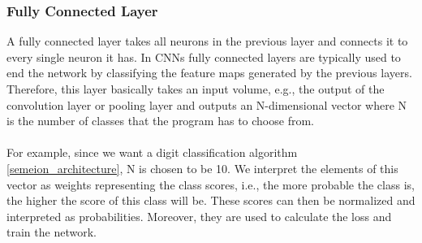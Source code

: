 \documentclass[a4paper, 11pt, twoside, openright]{article}
\begin{document}
\subsubsection{Fully Connected Layer} \label{subsub:fclayer}
A fully connected layer takes all neurons in the previous layer and connects it to every single neuron it has. In CNNs fully connected layers are typically used to end the network by classifying the feature maps generated by the previous layers. Therefore, this layer basically takes an input volume, e.g., the output of the convolution layer or pooling layer and outputs an N-dimensional vector where N is the number of classes that the program has to choose from.\\ \\
For example, since we want a digit classification algorithm \ref{semeion_architecture}, N is chosen to be 10. We interpret the elements of this vector as weights representing the class scores, i.e., the more probable the class is, the higher the score of this class will be. These scores can then be normalized and interpreted as probabilities. Moreover, they are used to calculate the loss and train the network.
\end{document}
